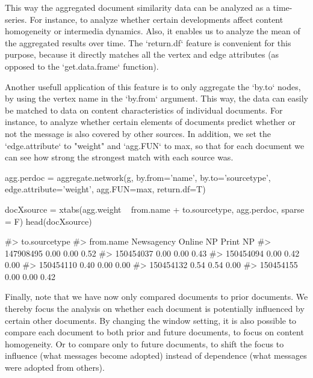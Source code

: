 This way the aggregated document similarity data can be analyzed as a time-series. 
For instance, to analyze whether certain developments affect content homogeneity or intermedia dynamics. 
Also, it enables us to analyze the mean of the aggregated results over time. 
The `return.df` feature is convenient for this purpose, because it directly matches all the vertex and edge attributes (as opposed to the `get.data.frame` function).

Another usefull application of this feature is to only aggregate the `by.to` nodes, by using the vertex name in the `by.from` argument. 
This way, the data can easily be matched to data on content characteristics of individual documents.
For instance, to analyze whether certain elements of documents predict whether or not the message is also covered by other sources.
In addition, we set the `edge.attribute` to "weight" and `agg.FUN` to max, so that for each document we can see how strong the strongest match with each source was. 

\begin{Schunk}
\begin{Sinput}
agg.perdoc = aggregate.network(g, by.from='name', by.to='sourcetype', 
                                  edge.attribute='weight', agg.FUN=max, 
                                  return.df=T)

docXsource = xtabs(agg.weight ~ from.name + to.sourcetype, agg.perdoc, sparse = F)
head(docXsource)
\end{Sinput}
\begin{Soutput}
#>            to.sourcetype
#> from.name   Newsagency Online NP Print NP
#>   147908495       0.00      0.00     0.52
#>   150454037       0.00      0.00     0.43
#>   150454094       0.00      0.42     0.00
#>   150454110       0.40      0.00     0.00
#>   150454132       0.54      0.54     0.00
#>   150454155       0.00      0.00     0.42
\end{Soutput}
\end{Schunk}

Finally, note that we have now only compared documents to prior documents. 
We thereby focus the analysis on whether each document is potentially influenced by certain other documents.
By changing the window setting, it is also possible to compare each document to both prior and future documents, to focus on content homogeneity.
Or to compare only to future documents, to shift the focus to influence (what messages become adopted) instead of dependence (what messages were adopted from others).

